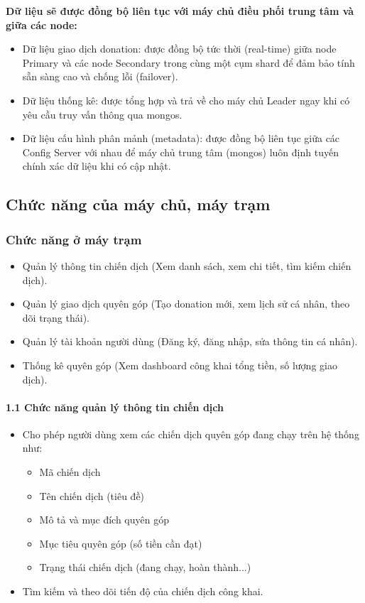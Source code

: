 \documentclass[12pt,a4paper]{article}
\begin{document}
\textbf{Dữ liệu sẽ được đồng bộ liên tục với máy chủ điều phối trung tâm và giữa các node:}
\begin{itemize}
    \item Dữ liệu giao dịch donation: được đồng bộ tức thời (real-time) giữa node Primary và các node Secondary trong cùng một cụm shard để đảm bảo tính sẵn sàng cao và chống lỗi (failover).
    \item Dữ liệu thống kê: được tổng hợp và trả về cho máy chủ Leader ngay khi có yêu cầu truy vấn thông qua mongos.
    \item Dữ liệu cấu hình phân mảnh (metadata): được đồng bộ liên tục giữa các Config Server với nhau để máy chủ trung tâm (mongos) luôn định tuyến chính xác dữ liệu khi có cập nhật.
\end{itemize}

\subsection{Chức năng của máy chủ, máy trạm}

\subsubsection{Chức năng ở máy trạm}

\begin{itemize}
    \item Quản lý thông tin chiến dịch (Xem danh sách, xem chi tiết, tìm kiếm chiến dịch).
    \item Quản lý giao dịch quyên góp (Tạo donation mới, xem lịch sử cá nhân, theo dõi trạng thái).
    \item Quản lý tài khoản người dùng (Đăng ký, đăng nhập, sửa thông tin cá nhân).
    \item Thống kê quyên góp (Xem dashboard công khai tổng tiền, số lượng giao dịch).
\end{itemize}

\paragraph{1.1 Chức năng quản lý thông tin chiến dịch} \mbox{} 
\begin{itemize}
    \item Cho phép người dùng xem các chiến dịch quyên góp đang chạy trên hệ thống như:
    \begin{itemize}
        \item Mã chiến dịch
        \item Tên chiến dịch (tiêu đề)
        \item Mô tả và mục đích quyên góp
        \item Mục tiêu quyên góp (số tiền cần đạt)
        \item Trạng thái chiến dịch (đang chạy, hoàn thành...)
    \end{itemize}
    \item Tìm kiếm và theo dõi tiến độ của chiến dịch công khai.
\end{itemize}
\end{document}
